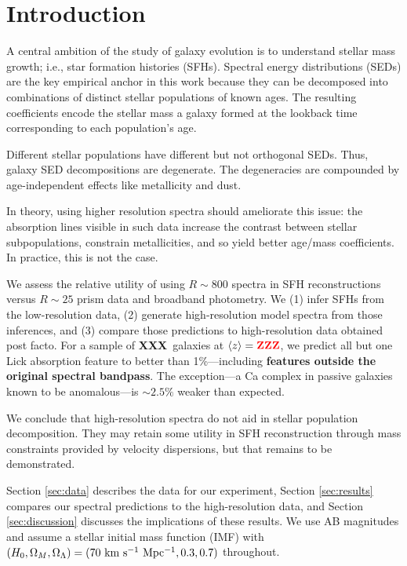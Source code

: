 \documentclass[a4paper,fleqn,usenatbib]{mnras}
\newcommand{\bfr}{\bf\color{red}}
\newcommand{\ntot}{{\bfr XXX}} %
\newcommand{\midz}{{\bfr ZZZ}} %
\begin{document}

\section{Introduction}
\label{sec:intro}

A central ambition of the study of galaxy evolution is to understand stellar mass growth; i.e., 
star formation histories (SFHs). Spectral energy distributions (SEDs) are the key empirical anchor 
in this work because they can be decomposed into combinations of distinct stellar populations of 
known ages. The resulting coefficients encode the stellar mass a galaxy formed at the lookback time 
corresponding to each population's age.
	
Different stellar populations have different but not orthogonal SEDs. Thus, galaxy SED decompositions 
are degenerate. The degeneracies are compounded by age-independent effects like metallicity 
and dust. 

In theory, using higher resolution spectra should ameliorate this issue: the absorption lines visible 
in such data increase the contrast between stellar subpopulations, constrain metallicities, and so yield 
better age/mass coefficients. In practice, this is not the case.

We assess the relative utility of using $R\sim800$ spectra in SFH reconstructions versus $R\sim25$ 
prism data and broadband photometry. We (1) infer SFHs from the low-resolution data, (2) generate 
high-resolution model spectra from those inferences, and (3) compare those predictions to 
high-resolution data obtained post facto. For a sample of \ntot\ galaxies at $\langle z\rangle=\midz$, 
we predict all but one Lick absorption feature \citep{Worthey94} to better than 1\%---including 
{\bfr features outside the original spectral bandpass}. The exception---a Ca complex 
in passive galaxies \citep{Williams09} known to be anomalous---is $\sim2.5\%$ weaker than expected. 


We conclude that high-resolution spectra do not aid in stellar population decomposition. They may 
retain some utility in SFH reconstruction through mass constraints provided by velocity dispersions, 
but that remains to be demonstrated.

Section \ref{sec:data} describes the data for our experiment, Section \ref{sec:results} compares 
our spectral predictions to the high-resolution data, and Section \ref{sec:discussion} discusses 
the implications of these results. We use AB magnitudes and assume 
a \citet{Chabrier03} stellar initial mass function (IMF) with $(H_{0}, \Omega_{M}, \Omega_{\Lambda}) =
(70~{\rm km~s^{-1}~Mpc^{-1}}, 0.3, 0.7)$ throughout.
\end{document}
